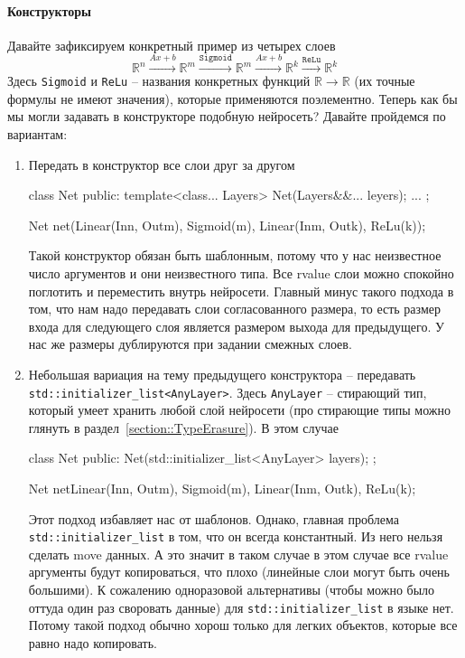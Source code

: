 \paragraph{Конструкторы}

Давайте зафиксируем конкретный пример из четырех слоев
\[
\mathbb R^n \stackrel{Ax + b}{\longrightarrow} \mathbb R^m \stackrel{\texttt{Sigmoid}}{\longrightarrow}\mathbb R^m \stackrel{Ax + b}{\longrightarrow}\mathbb R^k \stackrel{\texttt{ReLu}}{\longrightarrow}\mathbb R^k
\]
Здесь \verb"Sigmoid" и \verb"ReLu" -- названия конкретных функций $\mathbb R\to \mathbb R$ (их точные формулы не имеют значения), которые применяются поэлементно.
Теперь как бы мы могли задавать в конструкторе подобную нейросеть?
Давайте пройдемся по вариантам:
\begin{enumerate}
\item Передать в конструктор все слои друг за другом
\begin{cppcode}
class Net {
public:
  template<class... Layers>
  Net(Layers&&... leyers);
  ...
};

Net net(Linear(In{n}, Out{m}), Sigmoid(m), Linear(In{m}, Out{k}), ReLu(k));
\end{cppcode}
Такой конструктор обязан быть шаблонным, потому что у нас неизвестное число аргументов и они неизвестного типа.
Все rvalue слои можно спокойно поглотить и переместить внутрь нейросети.
Главный минус такого подхода в том, что нам надо передавать слои согласованного размера, то есть размер входа для следующего слоя является размером выхода для предыдущего.
У нас же размеры дублируются при задании смежных слоев.

\item Небольшая вариация на тему предыдущего конструктора -- передавать \verb"std::initializer_list<AnyLayer>".
Здесь \verb"AnyLayer" -- стирающий тип, который умеет хранить любой слой нейросети (про стирающие типы можно глянуть в раздел~\ref{section::TypeErasure}).
В этом случае
\begin{cppcode}
class Net {
public:
  Net(std::initializer_list<AnyLayer> layers);
};

Net net{Linear(In{n}, Out{m}), Sigmoid(m), Linear(In{m}, Out{k}), ReLu(k)};
\end{cppcode}
Этот подход избавляет нас от шаблонов.
Однако, главная проблема \verb"std::initializer_list" в том, что он всегда константный.
Из него нельзя сделать move данных.
А это значит в таком случае в этом случае все rvalue аргументы будут копироваться, что плохо (линейные слои могут быть очень большими).
К сожалению одноразовой альтернативы (чтобы можно было оттуда один раз своровать данные) для \verb"std::initializer_list" в языке нет.
Потому такой подход обычно хорош только для легких объектов, которые все равно надо копировать.


\end{enumerate}
